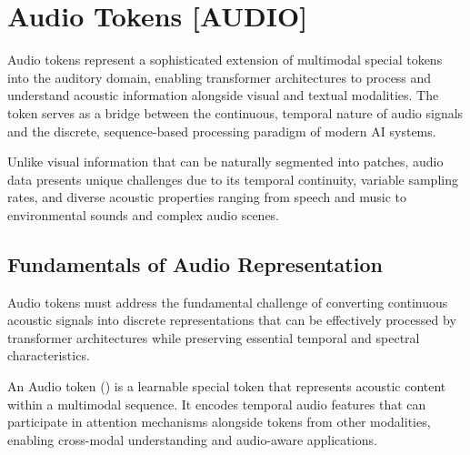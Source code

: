 
\section{Audio Tokens [AUDIO]}

Audio tokens represent a sophisticated extension of multimodal special tokens into the auditory domain, enabling transformer architectures to process and understand acoustic information alongside visual and textual modalities. The  token serves as a bridge between the continuous, temporal nature of audio signals and the discrete, sequence-based processing paradigm of modern AI systems.
\begin{comment}
Feedback: This is a strong start. To immediately frame the core challenge, you could add: "Unlike text with its clear word boundaries or images with their defined patches, audio is a continuous, high-frequency signal where information is encoded in subtle changes over time. The central task of an audio token is to discretize this fluid stream of information into meaningful chunks that a transformer can reason about."
\end{comment}

Unlike visual information that can be naturally segmented into patches, audio data presents unique challenges due to its temporal continuity, variable sampling rates, and diverse acoustic properties ranging from speech and music to environmental sounds and complex audio scenes.

\subsection{Fundamentals of Audio Representation}

Audio tokens must address the fundamental challenge of converting continuous acoustic signals into discrete representations that can be effectively processed by transformer architectures while preserving essential temporal and spectral characteristics.

\begin{definition}
An Audio token () is a learnable special token that represents acoustic content within a multimodal sequence. It encodes temporal audio features that can participate in attention mechanisms alongside tokens from other modalities, enabling cross-modal understanding and audio-aware applications.
\end{definition}

